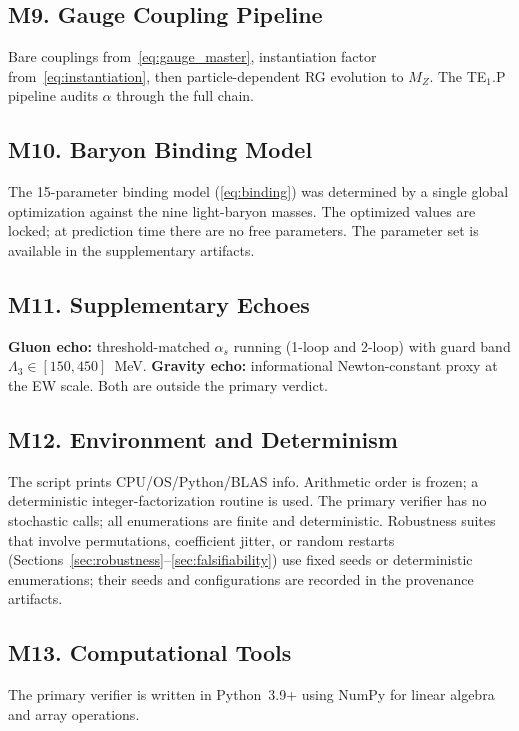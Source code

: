 \documentclass[11pt]{article}
\theoremstyle{remark}
\begin{document}
\subsection*{M9. Gauge Coupling Pipeline}

Bare couplings from~\eqref{eq:gauge_master}, instantiation factor from~\eqref{eq:instantiation}, then particle-dependent RG evolution to $M_Z$.
The TE$_1$.P pipeline audits $\alpha$ through the full chain.

\subsection*{M10. Baryon Binding Model}

The 15-parameter binding model (\cref{eq:binding}) was determined by a single global optimization against the nine light-baryon masses.
The optimized values are locked; at prediction time there are no free parameters.
The parameter set is available in the supplementary artifacts.

\subsection*{M11. Supplementary Echoes}

\textbf{Gluon echo:} threshold-matched $\alpha_s$ running (1-loop and 2-loop) with guard band $\Lambda_3 \in [150, 450]$~MeV.
\textbf{Gravity echo:} informational Newton-constant proxy at the EW scale.
Both are outside the primary verdict.

\subsection*{M12. Environment and Determinism}

The script prints CPU/OS/Python/BLAS info.
Arithmetic order is frozen; a deterministic integer-factorization routine is used.
The primary verifier has no stochastic calls; all enumerations are finite and deterministic.  Robustness suites that involve permutations, coefficient jitter, or random restarts (Sections~\ref{sec:robustness}--\ref{sec:falsifiability}) use fixed seeds or deterministic enumerations; their seeds and configurations are recorded in the provenance artifacts.

\subsection*{M13. Computational Tools}

The primary verifier is written in Python~3.9+ using NumPy for linear algebra and array operations.
\end{document}
